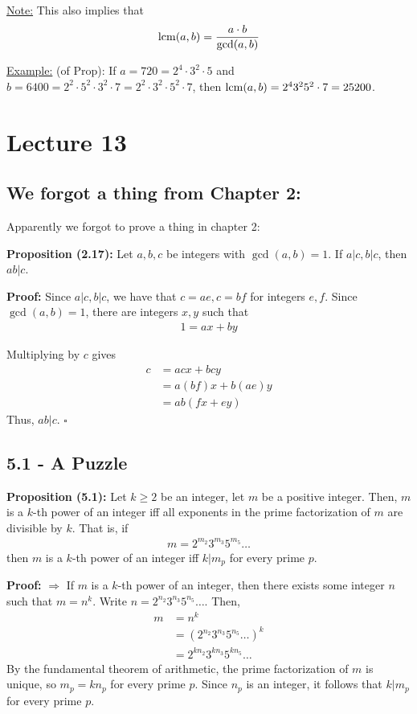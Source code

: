 \documentclass{article}
\newcommand*{\qed}{\hfill$\square$}%
\begin{document}
\underline{Note:} This also implies that \begin{align*}
    \mathrm{lcm}(a,b) = \frac{a\cdot b}{\gcd(a,b)}
\end{align*}

\underline{Example:} (of Prop): If $a=720=2^4\cdot 3^2 \cdot 5$ and $b=6400=2^2\cdot 5^2 \cdot 3^2\cdot 7=2^2\cdot 3^2\cdot 5^2\cdot 7$, then $\mathrm{lcm}(a,b)=2^{4}3^{2}5^{2}\cdot 7 = 25200$.

\section{Lecture 13}

\subsection{We forgot a thing from Chapter 2:}

Apparently we forgot to prove a thing in chapter 2:

\textbf{Proposition (2.17):} Let $a,b,c$ be integers with $\gcd(a,b)=1$. If $a|c,b|c$, then $ab|c$.

\textbf{Proof:} Since $a|c, b|c$, we have that $c=ae, c=bf$ for integers $e,f$. Since $\gcd(a,b)=1$, there are integers $x,y$ such that \begin{align*}
    1=ax+by
\end{align*}

Multiplying by $c$ gives \begin{align*}
    c &= acx + bcy \\
      &= a(bf)x + b(ae)y \\
      &= ab(fx + ey)
\end{align*}
Thus, $ab|c$. \qed

\subsection{5.1 - A Puzzle}

\textbf{Proposition (5.1):} Let $k\geq 2$ be an integer, let $m$ be a positive integer. Then, $m$ is a $k$-th power of an integer iff all exponents in the prime factorization of $m$ are divisible by $k$. That is, if \begin{align*}
    m=2^{m_2}3^{m_3}5^{m_5}\dots
\end{align*}then $m$ is a $k$-th power of an integer iff $k|m_p$ for every prime $p$.

\textbf{Proof:} $\Rightarrow$ If $m$ is a $k$-th power of an integer, then there exists some integer $n$ such that $m=n^k$. Write $n=2^{n_2}3^{n_3}5^{n_5}\dots$. Then, \begin{align*}
    m &= n^k \\
      &= (2^{n_2}3^{n_3}5^{n_5}\dots)^k \\
      &= 2^{kn_2}3^{kn_3}5^{kn_5}\dots
\end{align*}By the fundamental theorem of arithmetic, the prime factorization of $m$ is unique, so $m_p=kn_p$ for every prime $p$. Since $n_p$ is an integer, it follows that $k|m_p$ for every prime $p$.
\end{document}
